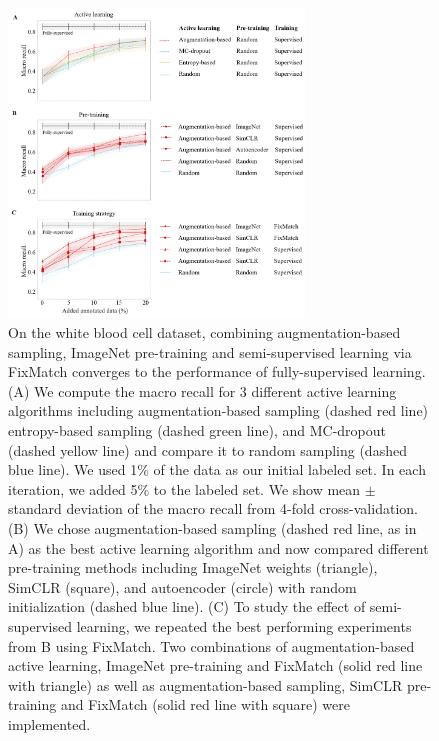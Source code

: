 \begin{figure}[htbp]
\centering
\captionsetup{format=plain}
\includegraphics[width=0.7\textwidth]{figures/fig_results_1.png}
\caption{On the white blood cell dataset, combining augmentation-based sampling, ImageNet pre-training and semi-supervised learning via FixMatch converges to the performance of fully-supervised learning. (A) We compute the macro recall for 3 different active learning algorithms including augmentation-based sampling (dashed red line) entropy-based sampling (dashed green line), and MC-dropout (dashed yellow line) and compare it to random sampling (dashed blue line). We used 1\% of the data as our initial labeled set. In each iteration, we added 5\% to the labeled set. We show mean $\pm$ standard deviation of the macro recall from 4-fold cross-validation. (B) We chose augmentation-based sampling (dashed red line, as in A) as the best active learning algorithm and now compared different pre-training methods including ImageNet weights (triangle), SimCLR (square), and autoencoder (circle) with random initialization (dashed blue line). (C) To study the effect of semi-supervised learning, we repeated the best performing experiments from B using FixMatch. Two combinations of augmentation-based active learning, ImageNet pre-training and FixMatch (solid red line with triangle) as well as augmentation-based sampling, SimCLR pre-training and FixMatch (solid red line with square) were implemented. }
\label{fig:results_1}
\end{figure}

